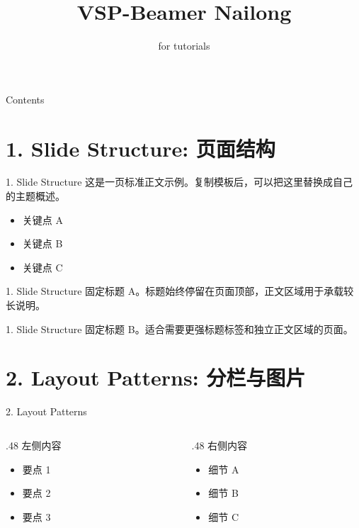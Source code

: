 \documentclass[aspectratio=169,10pt]{beamer}
\title[VSP-Beamer Nailong]{VSP-Beamer Nailong}
\subtitle{for tutorials}
\date{}
\begin{document}
\VSPtitleframe


\begin{frame}{Contents}
  \tableofcontents
\end{frame}

\section{1. Slide Structure: 页面结构}

\begin{frame}[fragile]{1. Slide Structure}
这是一页标准正文示例。复制模板后，可以把这里替换成自己的主题概述。

\begin{itemize}
\item
  关键点 A
\item
  关键点 B
\item
  关键点 C
\end{itemize}
\end{frame}

\begin{frame}[fragile]{1. Slide Structure}
固定标题 A。标题始终停留在页面顶部，正文区域用于承载较长说明。
\end{frame}

\begin{frame}[fragile]{1. Slide Structure}
固定标题 B。适合需要更强标题标签和独立正文区域的页面。
\end{frame}

\section{2. Layout Patterns: 分栏与图片}

\begin{frame}[fragile]{2. Layout Patterns}
\begin{columns}[T,onlytextwidth]
  \begin{column}{.48\textwidth}
    左侧内容
    
    \begin{itemize}
    \item
      要点 1
    \item
      要点 2
    \item
      要点 3
    \end{itemize}
  \end{column}
  \begin{column}{.48\textwidth}
    右侧内容
    
    \begin{itemize}
    \item
      细节 A
    \item
      细节 B
    \item
      细节 C
    \end{itemize}
  \end{column}
\end{columns}
\end{frame}
\end{document}

